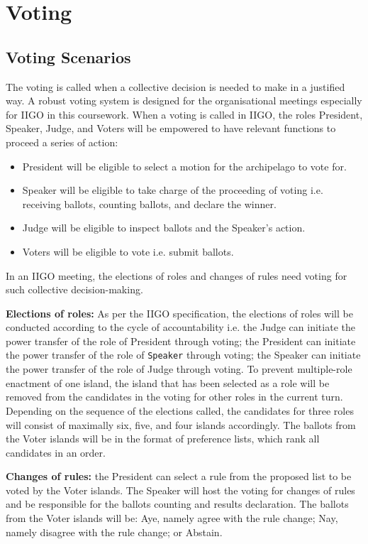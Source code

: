 \chapter{Voting}
\section{Voting Scenarios}
\label{sec:VotingScenarios}

The voting is called when a collective decision is needed to make in a justified way. A robust voting system is designed for the organisational meetings especially for IIGO in this coursework. %
When a voting is called in IIGO, the roles President, Speaker, Judge, and Voters will be empowered to have relevant functions to proceed a series of action:
\begin{itemize}
    \item President will be eligible to select a motion for the archipelago to vote for.
    \item Speaker will be eligible to take charge of the proceeding of voting i.e. receiving ballots, counting ballots, and declare the winner.
    \item Judge will be eligible to inspect ballots and the Speaker's action. %
    \item Voters will be eligible to vote i.e. submit ballots.
\end{itemize}

In an IIGO meeting, the elections of roles and changes of rules need voting for such collective decision-making.

\textbf{Elections of roles:} As per the IIGO specification, the elections of roles will be conducted according to the cycle of accountability i.e. the Judge can initiate the power transfer of the role of President through voting; the President can initiate the power transfer of the role of \texttt{Speaker} through voting; the Speaker can initiate the power transfer of the role of Judge through voting. To prevent multiple-role enactment of one island, the island that has been selected as a role will be removed from the candidates in the voting for other roles in the current turn. Depending on the sequence of the elections called, the candidates for three roles will consist of maximally six, five, and four islands accordingly. The ballots from the Voter islands will be in the format of preference lists, which rank all candidates in an order.

\textbf{Changes of rules:} the President can select a rule from the proposed list to be voted by the Voter islands. The Speaker will host the voting for changes of rules and be responsible for the ballots counting and results declaration. The ballots from the Voter islands will be: Aye, namely agree with the rule change; Nay, namely disagree with the rule change; or Abstain.


